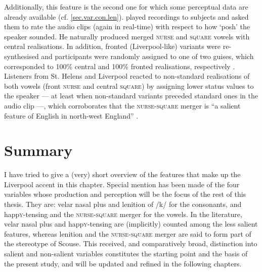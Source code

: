 Additionally, this feature is the second one for which some perceptual data are already available (cf. \ref{sec.var.con.len}).
\textcite{watsonclark2013} played recordings to subjects and asked them to rate the audio clips (again in real-time) with respect to how `posh' the speaker sounded.
He naturally produced merged \textsc{nurse} and \textsc{square} vowels with central realisations.
In addition, fronted (Liverpool-like) variants were re-synthesised and participants were randomly assigned to one of two guises, which corresponded to 100\% central and 100\% fronted realisations, respectively \parencite[cf.][305--306]{watsonclark2013}.
Listeners from St. Helens and Liverpool reacted to non-standard realisations of both vowels (front \textsc{nurse} and central \textsc{square}) by assigning lower status values to the speaker --- at least when non-standard variants preceded standard ones in the audio clip ---, which corroborates that the \textsc{nurse}-\textsc{square} merger is ``a salient feature of English in north-west England'' \parencite[cf.][317--320]{watsonclark2013}.

	\section{Summary}

I have tried to give a (very) short overview of the features that make up the Liverpool accent in this chapter.
Special mention has been made of the four variables whose production and perception will be the focus of the rest of this thesis.
They are: velar nasal plus and lenition of /k/ for the consonants, and happ\textsc{y}-tensing and the \textsc{nurse}-\textsc{square} merger for the vowels.
In the literature, velar nasal plus and happ\textsc{y}-tensing are (implicitly) counted among the less salient features, whereas lenition and the \textsc{nurse}-\textsc{square} merger are said to form part of the stereotype of Scouse.
This received, and comparatively broad, distinction into salient and non-salient variables constitutes the starting point and the basis of the present study, and will be updated and refined in the following chapters.